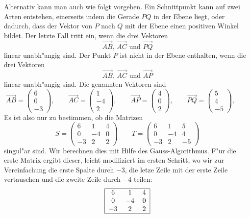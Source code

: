 \begin{loesung}
Alternativ kann man auch wie folgt vorgehen.
Ein Schnittpunkt kann auf zwei Arten entstehen, einerseits indem
die Gerade $PQ$ in der Ebene liegt, oder dadurch, dass der Vektor
von $P$ nach $Q$ mit der Ebene einen positiven Winkel bildet. Der
letzte Fall tritt ein, wenn die drei Vektoren
\[
\overrightarrow{AB}
\text{, }
\overrightarrow{AC}
\text{ und }
\overrightarrow{PQ}
\]
linear unabh"angig sind. Der Punkt $P$ ist nicht in der Ebene enthalten,
wenn die drei Vektoren
\[
\overrightarrow{AB}
\text{, }
\overrightarrow{AC}
\text{ und }
\overrightarrow{AP}
\]
linear unabh"angig sind.
Die genannten Vektoren sind
\[
\overrightarrow{AB}=\begin{pmatrix}6\\0\\-3\end{pmatrix}, \qquad
\overrightarrow{AC}=\begin{pmatrix}1\\-4\\2\end{pmatrix}, \qquad
\overrightarrow{AP}=\begin{pmatrix}4\\0\\2\end{pmatrix}, \qquad
\overrightarrow{PQ}=\begin{pmatrix}5\\4\\-5\end{pmatrix}, \qquad
\]
Es ist also nur zu bestimmen, ob die Matrizen
\[
S=\begin{pmatrix}
6&1&4\\
0&-4&0\\
-3&2&2
\end{pmatrix}
\qquad
T=\begin{pmatrix}
6&1&5\\
0&-4&4\\
-3&2&-5
\end{pmatrix}
\]
singul"ar sind. Wir berechnen dies mit Hilfe des Gauss-Algorithmus.
F"ur die erste Matrix ergibt dieser, leicht modifiziert im ersten
Schritt, wo wir zur Vereinfachung die erste Spalte durch $-3$, die letze Zeile
mit der  erste Zeile vertauschen und die zweite Zeile durch $-4$ teilen:
\begin{align*}
\begin{tabular}{|ccc|}
\hline
6&1&4\\
0&$-4$&0\\
$-3$&2&2\\
\hline
\end{tabular}

\end{align*}
\end{loesung}
